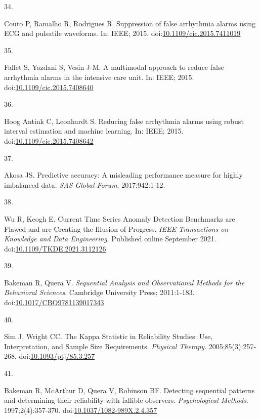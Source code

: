 \documentclass[12pt,twoside]{fmupthesis}
\newlength{\csllabelwidth}
\newlength{\cslhangindent}
\newenvironment{CSLReferences}[2] %
 {%
  \setlength{\parindent}{0pt}
  \ifodd #1 \everypar{\setlength{\hangindent}{\cslhangindent}}\ignorespaces\fi
  \ifnum #2 > 0
  \setlength{\parskip}{#2\baselineskip}
  \fi
 }%
 {}
\newcommand{\CSLLeftMargin}[1]{\parbox[t]{\csllabelwidth}{#1}}
\newcommand{\CSLRightInline}[1]{\parbox[t]{\linewidth - \csllabelwidth}{#1}}
\begin{document}
\begin{CSLReferences}{0}{0}
\leavevmode{}%
\CSLLeftMargin{34. }
\CSLRightInline{Couto P, Ramalho R, Rodrigues R. Suppression of false arrhythmia alarms using ECG and pulsatile waveforms. In: IEEE; 2015. doi:\href{https://doi.org/10.1109/cic.2015.7411019}{10.1109/cic.2015.7411019}}

\leavevmode{}%
\CSLLeftMargin{35. }
\CSLRightInline{Fallet S, Yazdani S, Vesin J-M. A multimodal approach to reduce false arrhythmia alarms in the intensive care unit. In: IEEE; 2015. doi:\href{https://doi.org/10.1109/cic.2015.7408640}{10.1109/cic.2015.7408640}}

\leavevmode{}%
\CSLLeftMargin{36. }
\CSLRightInline{Hoog Antink C, Leonhardt S. Reducing false arrhythmia alarms using robust interval estimation and machine learning. In: IEEE; 2015. doi:\href{https://doi.org/10.1109/cic.2015.7408642}{10.1109/cic.2015.7408642}}

\leavevmode{}%
\CSLLeftMargin{37. }
\CSLRightInline{Akosa JS. {Predictive accuracy: A misleading performance measure for highly imbalanced data}. \emph{SAS Global Forum}. 2017;942:1-12.}

\leavevmode{}%
\CSLLeftMargin{38. }
\CSLRightInline{Wu R, Keogh E. {Current Time Series Anomaly Detection Benchmarks are Flawed and are Creating the Illusion of Progress}. \emph{IEEE Transactions on Knowledge and Data Engineering}. Published online September 2021. doi:\href{https://doi.org/10.1109/TKDE.2021.3112126}{10.1109/TKDE.2021.3112126}}

\leavevmode{}%
\CSLLeftMargin{39. }
\CSLRightInline{Bakeman R, Quera V. \emph{{Sequential Analysis and Observational Methods for the Behavioral Sciences}}. Cambridge University Press; 2011:1-183. doi:\href{https://doi.org/10.1017/CBO9781139017343}{10.1017/CBO9781139017343}}

\leavevmode{}%
\CSLLeftMargin{40. }
\CSLRightInline{Sim J, Wright CC. {The Kappa Statistic in Reliability Studies: Use, Interpretation, and Sample Size Requirements}. \emph{Physical Therapy}. 2005;85(3):257-268. doi:\href{https://doi.org/10.1093/ptj/85.3.257}{10.1093/ptj/85.3.257}}

\leavevmode{}%
\CSLLeftMargin{41. }
\CSLRightInline{Bakeman R, McArthur D, Quera V, Robinson BF. {Detecting sequential patterns and determining their reliability with fallible observers.} \emph{Psychological Methods}. 1997;2(4):357-370. doi:\href{https://doi.org/10.1037/1082-989X.2.4.357}{10.1037/1082-989X.2.4.357}}


\end{CSLReferences}
\end{document}
